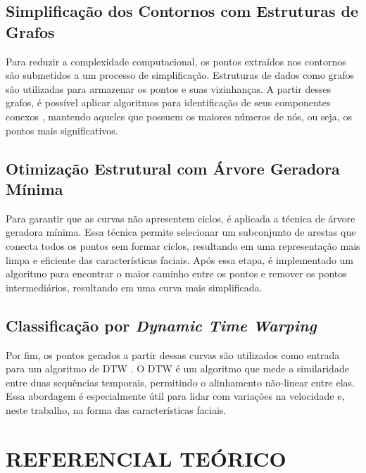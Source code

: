 
\subsection{Simplificação dos Contornos com Estruturas de Grafos}

Para reduzir a complexidade computacional, os pontos extraídos nos contornos são submetidos a um processo de simplificação. Estruturas de dados como grafos são utilizadas para armazenar os pontos e suas vizinhanças. A partir desses grafos, é possível aplicar algoritmos para identificação de seus componentes conexos \cite{Scipy}, mantendo aqueles que possuem os maiores números de nós, ou seja, os pontos mais significativos.

\subsection{Otimização Estrutural com Árvore Geradora Mínima}

Para garantir que as curvas não apresentem ciclos, é aplicada a técnica de árvore geradora mínima. Essa técnica permite selecionar um subconjunto de arestas que conecta todos os pontos sem formar ciclos, resultando em uma representação mais limpa e eficiente das características faciais. Após essa etapa, é implementado um algoritmo para encontrar o maior caminho entre os pontos e remover os pontos intermediários, resultando em uma curva mais simplificada.

\subsection{Classificação por \textit{Dynamic Time Warping}}

Por fim, os pontos gerados a partir dessas curvas são utilizados como entrada para um algoritmo de DTW \cite{SAKOE, tavenard.blog.dtw}. O DTW é um algoritmo que mede a similaridade entre duas sequências temporais, permitindo o alinhamento não-linear entre elas. Essa abordagem é especialmente útil para lidar com variações na velocidade e, neste trabalho, na forma das características faciais.

\section{REFERENCIAL TEÓRICO}

